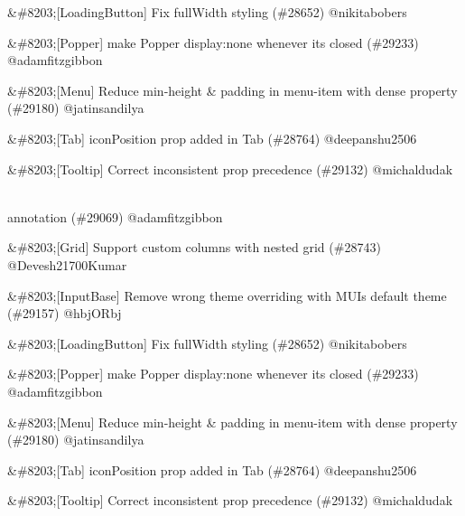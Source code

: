 \begin{DoxyRefList}
\begin{DoxyItemize}
\item \&\#8203;\mbox{[}Loading\+Button\mbox{]} Fix {\ttfamily full\+Width} styling (\#28652) @nikitabobers
\item \&\#8203;\mbox{[}Popper\mbox{]} make Popper display\+:none whenever it\textquotesingle{}s closed (\#29233) @adamfitzgibbon
\item \&\#8203;\mbox{[}Menu\mbox{]} Reduce min-\/height \& padding in menu-\/item with dense property (\#29180) @jatinsandilya
\item \&\#8203;\mbox{[}Tab\mbox{]} {\ttfamily icon\+Position} prop added in Tab (\#28764) @deepanshu2506
\item \&\#8203;\mbox{[}Tooltip\mbox{]} Correct inconsistent prop precedence (\#29132) @michaldudak
\end{DoxyItemize}
\item[Page \doxylink{md__c_1_2_users_2saket_2_one_drive_2_desktop_2e_pathshala_2epathshala-_web_2node__modules_2_0dmudfd4c9f7d118620d4480d04b24d53426}{Versions} ]\hfill \\
\label{deprecated__deprecated000003}%
%
annotation (\#29069) @adamfitzgibbon
\begin{DoxyItemize}
\item \&\#8203;\mbox{[}Grid\mbox{]} Support custom columns with nested grid (\#28743) @\+Devesh21700\+Kumar
\item \&\#8203;\mbox{[}Input\+Base\mbox{]} Remove wrong theme overriding with MUI\textquotesingle{}s default theme (\#29157) @hbj\+ORbj
\item \&\#8203;\mbox{[}Loading\+Button\mbox{]} Fix {\ttfamily full\+Width} styling (\#28652) @nikitabobers
\item \&\#8203;\mbox{[}Popper\mbox{]} make Popper display\+:none whenever it\textquotesingle{}s closed (\#29233) @adamfitzgibbon
\item \&\#8203;\mbox{[}Menu\mbox{]} Reduce min-\/height \& padding in menu-\/item with dense property (\#29180) @jatinsandilya
\item \&\#8203;\mbox{[}Tab\mbox{]} {\ttfamily icon\+Position} prop added in Tab (\#28764) @deepanshu2506
\item \&\#8203;\mbox{[}Tooltip\mbox{]} Correct inconsistent prop precedence (\#29132) @michaldudak
\end{DoxyItemize}
\item[Page \doxylink{md__c_1_2_users_2saket_2_one_drive_2_desktop_2e_pathshala_2epathshala-_web_2node__modules_2_0dmuab8a729db3966f628dee43470c3b1bcd}{Versions} ]\hfill \\

\end{DoxyRefList}
